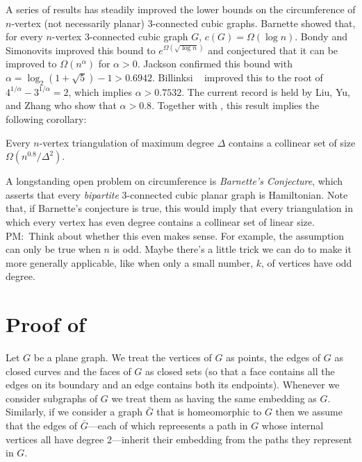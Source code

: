 \documentclass{patmorin}
\newcommand{\note}[2]{{\color{red}#1:~#2}}
\begin{document}
A series of results has steadily improved the lower bounds on the
circumference of $n$-vertex  (not necessarily planar) 3-connected cubic
graphs.  Barnette \cite{barnette:4} showed that, for every $n$-vertex
3-connected cubic graph $G$, $c(G)=\Omega(\log n)$.  Bondy and Simonovits
\cite{bondy.simonovits:7} improved this bound to $e^{\Omega(\sqrt{\log
n})}$ and conjectured that it can be improved to $\Omega(n^\alpha)$ for $\alpha>0$.
Jackson \cite{jackson:8} confirmed this bound with $\alpha=\log_2(1+\sqrt{5})-1
> 0.6942$.  Billinksi \etal\ \cite{billinksi.jacdson.ea:6} improved this
to the root of $4^{1/\alpha}-3^{1/\alpha}=2$, which implies $\alpha>0.7532$.  The current
record is held by Liu, Yu, and Zhang \cite{liu.yu.zhang:circumference}
who show that $\alpha>0.8$.  Together with , this result implies
the following corollary:

\begin{cor}
  Every $n$-vertex triangulation of maximum degree $\Delta$ contains a
  collinear set of size $\Omega(n^{0.8}/\Delta^2)$.
\end{cor}

A longstanding open problem on circumference is \emph{Barnette's
Conjecture}, which asserts that every \emph{bipartite} 3-connected cubic
planar graph is Hamiltonian. Note that, if Barnette's conjecture is true,
this would imply that every triangulation in which every vertex has even
degree contains a collinear set of linear size.  \note{PM}{Think about
whether this even makes sense. For example, the assumption can only be
true when $n$ is odd.  Maybe there's a little trick we can do to make
it more generally applicable, like when only a small number, $k$, of
vertices have odd degree.}



\section{Proof of }

Let $G$ be a plane graph.  We treat the vertices of $G$ as points,
the edges of $G$ as closed curves and the faces of $G$ as closed sets
(so that a face contains all the edges on its boundary and an edge
contains both its endpoints).  Whenever we consider subgraphs of $G$
we treat them as having the same embedding as $G$.  Similarly, if we
consider a graph $\bar{G}$ that is homeomorphic to $G$ then we assume
that the edges of $\bar{G}$---each of which repreesents a path in $G$
whose internal vertices all have degree 2---inherit their embedding from
the paths they represent in $G$.
\end{document}
